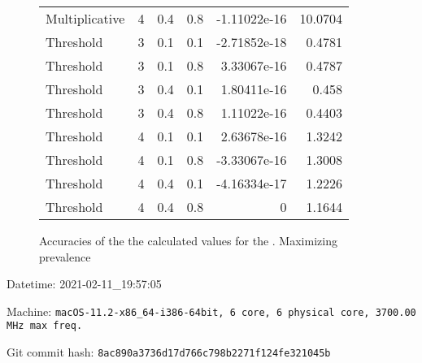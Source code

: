 \documentclass{article}
\begin{document}
\begin{figure}[H]
\begin{tabular}{lrrrrr}
 Multiplicative &       4 &   0.4 &            0.8 & -1.11022e-16 &           10.0704 \\
 Threshold      &       3 &   0.1 &            0.1 & -2.71852e-18 &            0.4781 \\
 Threshold      &       3 &   0.1 &            0.8 &  3.33067e-16 &            0.4787 \\
 Threshold      &       3 &   0.4 &            0.1 &  1.80411e-16 &            0.458  \\
 Threshold      &       3 &   0.4 &            0.8 &  1.11022e-16 &            0.4403 \\
 Threshold      &       4 &   0.1 &            0.1 &  2.63678e-16 &            1.3242 \\
 Threshold      &       4 &   0.1 &            0.8 & -3.33067e-16 &            1.3008 \\
 Threshold      &       4 &   0.4 &            0.1 & -4.16334e-17 &            1.2226 \\
 Threshold      &       4 &   0.4 &            0.8 &  0           &            1.1644 \\
\hline
\end{tabular}
\caption{Accuracies of the the calculated values for the \penetrances. Maximizing prevalence}
\end{figure}
Datetime: 2021-02-11\_19:57:05

Machine: \texttt{macOS-11.2-x86\_64-i386-64bit, 6 core, 6 physical core, 3700.00 MHz max freq.}

Git commit hash: \texttt{8ac890a3736d17d766c798b2271f124fe321045b}
\end{document}
